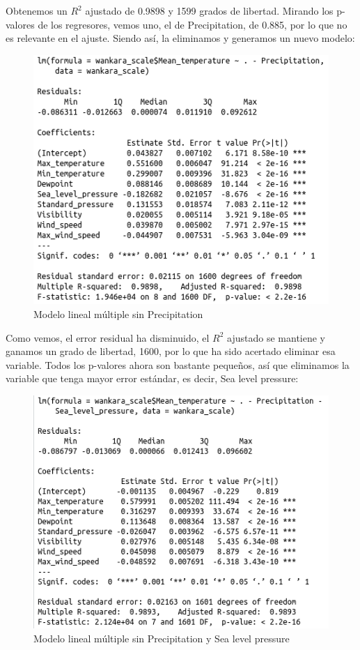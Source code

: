 Obtenemos un $R^2$ ajustado de 0.9898 y 1599 grados de libertad. Mirando los p-valores de los regresores, vemos uno, el de Precipitation, de 0.885, por lo que no es relevante en el ajuste. Siendo así, la eliminamos y generamos un nuevo modelo:

\begin{figure}[H] %
	\centering
	\includegraphics[scale=0.6]{mlm2.png}  %
	\caption{Modelo lineal múltiple sin Precipitation} 
	\label{fig:mlm2}
\end{figure}

Como vemos, el error residual ha disminuido, el $R^2$ ajustado se mantiene y ganamos un grado de libertad, 1600, por lo que ha sido acertado eliminar esa variable. Todos los p-valores ahora son bastante pequeños, así que eliminamos la variable que tenga mayor error estándar, es decir, Sea level pressure:

\begin{figure}[H] %
	\centering
	\includegraphics[scale=0.6]{mlm3.png}  %
	\caption{Modelo lineal múltiple sin Precipitation y Sea level pressure} 
	\label{fig:mlm3}
\end{figure}

